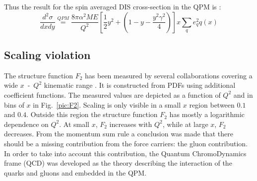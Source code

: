 Thus the result for the spin averaged DIS cross-section in the QPM is \cite{BERGER}:
%
\begin{equation}
  \frac{d^2\sigma}{dxdy} \stackrel{QPM}{=} \frac{8\pi\alpha^2ME}{Q^2}\left[\frac{1}{2}y^2+\left(1-y-\frac{y^2\gamma^2}{4}\right)\right]x\sum\limits_{q}e^2_qq(x)
\end{equation}

\subsection{Scaling violation}

The structure function $F_2$ has been measured by several collaborations covering a wide $x$~-~$Q^2$ kinematic range \cite{PDG}. It is constructed from PDFs using additional coefficient functions. The measured values are depicted as a function of $Q^2$ and in bins of $x$ in Fig.~\ref{pic:F2}. Scaling is only visible in a small $x$ region between $0.1$ and $0.4$. Outside this region the structure function $F_2$ has mostly a logarithmic dependence on $Q^2$. At small $x$, $F_2$ increases with $Q^2$, while at large $x$, $F_2$ decreases. From the momentum sum rule a conclusion was made that there should be a missing contribution from the force carriers: the gluon contribution. In order to take into account this contribution, the Quantum ChromoDynamics frame (QCD) was developed as the theory describing the interaction of the quarks and gluons and embedded in the QPM.

